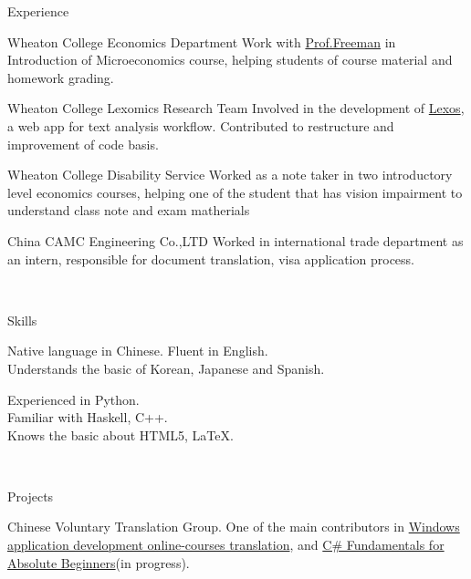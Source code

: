 \documentclass[]{resume-knyte}
\begin{document}
\begin{topic}{Experience}

    
    {Wheaton College Economics Department}
    {Work with \href{https://wheatoncollege.edu/academics/faculty-directory/james-freeman/}{Prof.Freeman}
    in Introduction of Microeconomics course, helping students of course material and homework grading.}
    
    {Wheaton College Lexomics Research Team}
    {Involved in the development of \href{https://github.com/WheatonCS/Lexos}{Lexos}, a web app for text analysis workflow.
    Contributed to restructure and improvement of code basis.}
    
    {Wheaton College Disability Service}
    {Worked as a note taker in two introductory level economics courses, 
    helping one of the student that has vision impairment to understand class note and exam matherials}
    
    {China CAMC Engineering Co.,LTD}
    {Worked in international trade department as an intern, responsible for document translation, visa application process.}

\\ %
\end{topic}


\begin{topic}{Skills}

    {Native language in Chinese. 
    Fluent in English. \\
    Understands the basic of Korean, Japanese and Spanish.}

    {Experienced in Python.\\
    Familiar with Haskell, C++.\\
    Knows the basic about HTML5, \LaTeX{}.}

    \\ %
\end{topic}

\begin{topic}{Projects}


    {Chinese Voluntary Translation Group.}
    {One of the main contributors in \href{https://github.com/chantisnake/AbsoluteBeginnersWin10}
    {Windows application development online-courses translation},
    and \href{https://mva.microsoft.com/en-us/training-courses/c-fundamentals-for-absolute-beginners-16169?l=p90QdGQIC_7106218949}
    {C\# Fundamentals for Absolute Beginners}(in progress).}

\end{topic}
\end{document}

